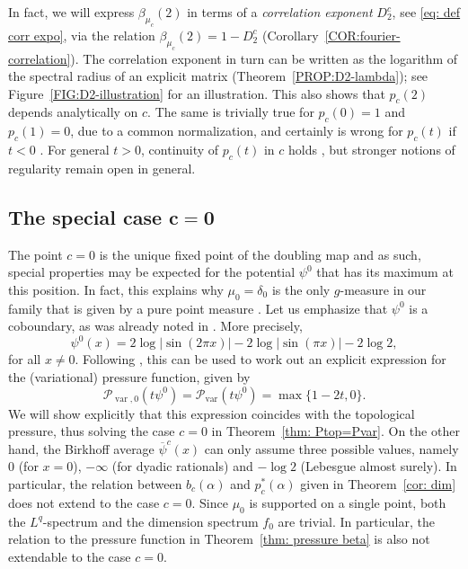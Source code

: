 \documentclass[11pt,reqno]{amsart}
\theoremstyle{plain}
\theoremstyle{definition}
\newcommand{\mc}{\mathcal}
\begin{document}
In fact, we will express $\beta_{\mu_c}(2)$ in terms of a \emph{correlation exponent} $D_2^{c}$, see \eqref{eq: def corr expo},  via the relation $\beta_{\mu_c}(2) = 1 - D_2^c$ (Corollary~\ref{COR:fourier-correlation}). The correlation exponent in turn can be written as the logarithm of the spectral radius of an explicit matrix (Theorem~\ref{PROP:D2-lambda}); see Figure~\ref{FIG:D2-illustration} for an illustration. 
This also shows that $p_c(2)$ depends analytically on $c$. The same is trivially true for $p_c(0) = 1$ and $p_c(1) = 0$, due to a common normalization, and certainly is wrong for $p_c(t)$ if $t < 0$ \cite{fan_generalized_2020}. For general $t>0$, continuity of $p_c(t)$ in $c$ holds \cite{GLSprep}, but stronger notions of regularity remain open in general.


\subsection{The special case $\boldsymbol{c=0}$}\label{subsec: c=0}

The point $c=0$ is the unique fixed point of the doubling map and as such, special properties may be expected for the potential $\psi^0$ that has its maximum at this position. In fact, this explains why $\mu_0 = \delta_0$ is the only $g$-measure in our family that is given by a pure point measure  \cite{ConzeRaugi}. Let us emphasize that $\psi^0$ is a coboundary, as was already noted in \cite{fan_generalized_2020}. More precisely,
\begin{equation}
\label{EQ:coboundary}
\psi^0(x) = 2 \log |\sin(2 \pi x)| - 2 \log |\sin(\pi x)| - 2 \log 2,
\end{equation}
for all $x \neq 0$. Following \cite{fan_generalized_2020}, this can be used to work out an explicit expression for the (variational) pressure function, given by
\begin{equation}
\label{EQ:var-P-at-0}
\mc P_{\operatorname{var},{0}}(t \psi^{0}) = \mc P_{\operatorname{var}}(t \psi^{0}) = \max\{ 1-2t, 0 \}.
\end{equation}
We will show explicitly that this expression coincides with the topological pressure, thus solving the case $c=0$ in Theorem~\ref{thm: Ptop=Pvar}.
On the other hand, the Birkhoff average $\overline{\psi}^c(x)$ can only assume three possible values, namely $0$ (for $x=0$), $- \infty$ (for dyadic rationals) and $- \log 2$ (Lebesgue almost surely). In particular, the relation between $b_c(\alpha)$ and $p_c^{\ast}(\alpha)$ given in Theorem~\ref{cor: dim} does not extend to the case $c=0$. 
Since $\mu_0$ is supported on a single point, both the $L^q$-spectrum and the dimension spectrum $f_0$ are trivial. In particular, the relation to the pressure function in Theorem~\ref{thm: pressure beta} is also not extendable to the case $c=0$.
\end{document}
